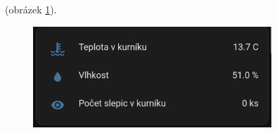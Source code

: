 (obrázek \ref{fig:homeasistant_temperature}).

\begin{figure}[H]
    \centering
    \includegraphics[width=0.8\textwidth]{img/homeasistant_temperature}
    \label{fig:homeasistant_temperature}
\end{figure}


%

%
